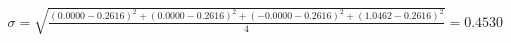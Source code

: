 \documentclass[preview]{standalone}
\begin{document}
\begin{align*}
\sigma = \sqrt{\frac{(0.0000 - 0.2616)^2 + (0.0000 - 0.2616)^2 + (-0.0000 - 0.2616)^2 + (1.0462 - 0.2616)^2}{4}} = 0.4530
\end{align*}
\end{document}
